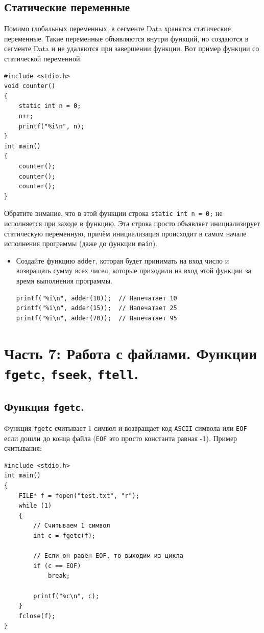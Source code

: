 \documentclass{article}
\begin{document}
\subsection*{Статические переменные}
Помимо глобальных переменных, в сегменте Data хранятся статические переменные. Такие переменные объявляются внутри функций, но создаются в сегменте Data и не удаляются при завершении функции. Вот пример функции со статической переменной.
\begin{lstlisting}
#include <stdio.h>
void counter() 
{
    static int n = 0;
    n++;
    printf("%i\n", n);
}
int main() 
{
    counter();
    counter();
    counter();
}
\end{lstlisting}
Обратите внмание, что в этой функции строка \texttt{static int n = 0;} не исполняется при заходе в функцию. Эта строка просто объявляет инициализирует статическую переменную, причём инициализация происходит в самом начале исполнения программы (даже до функции \texttt{main}). 

\begin{itemize}
\item Создайте функцию \texttt{adder}, которая будет принимать на вход число и возвращать сумму всех чисел, которые приходили на вход этой функции за время выполнения программы.
\begin{lstlisting}
printf("%i\n", adder(10));  // Напечатает 10
printf("%i\n", adder(15));  // Напечатает 25
printf("%i\n", adder(70));  // Напечатает 95
\end{lstlisting}
\end{itemize}




\newpage
\section*{Часть 7: Работа с файлами. Функции \texttt{fgetc}, \texttt{fseek}, \texttt{ftell}.}
\subsection*{Функция \texttt{fgetс}.}
Функция \texttt{fgetc} считывает 1 символ и возвращает код \texttt{ASCII} символа или \texttt{EOF} если дошли до конца файла (\texttt{EOF} это просто константа равная -1). Пример считывания:

\begin{lstlisting}
#include <stdio.h>
int main()
{
    FILE* f = fopen("test.txt", "r");
    while (1)
    {
        // Считываем 1 символ
        int c = fgetc(f);
		
        // Если он равен EOF, то выходим из цикла
        if (c == EOF)
            break;
            
        printf("%c\n", c);
	}
    fclose(f);
}
\end{lstlisting}
\end{document}
